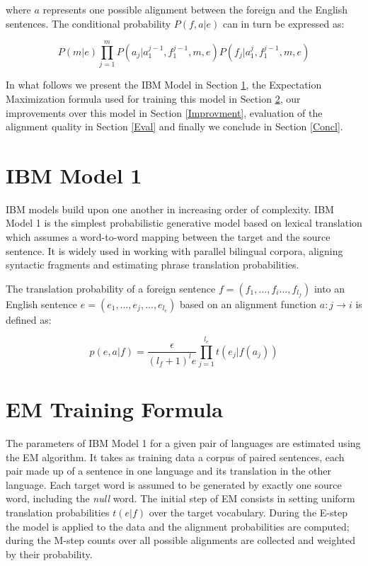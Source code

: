 \documentclass[11pt]{article}
\begin{document}
where $a$ represents one possible alignment between the foreign and the English sentences. The conditional probability $P(f,a|e)$ can in turn be expressed as:

\begin{equation}
P(m|e) \prod_{j=1}^{m} P(a_j|a_1^{j-1}, f_1^{j-1}, m, e) P(f_j|a_1^j,f_1^{j-1},m,e)
\end{equation}

In what follows we present the IBM Model in Section \ref{IBM1}, the Expectation Maximization formula used for training this model in Section \ref{EM}, our improvements over this model in Section \ref{Improvment}, evaluation of the alignment quality in Section \ref{Eval} and finally we conclude in Section \ref{Concl}.



\section{IBM Model 1}
\label{IBM1}
IBM models build upon one another in increasing order of complexity. IBM Model 1 is the simplest probabilistic generative model based on lexical translation which assumes a word-to-word mapping between the target and the source sentence. It is widely used in working with parallel bilingual corpora, aligning syntactic fragments and estimating phrase translation probabilities.

The translation probability of a foreign sentence $f = (f_1,\dots, f_i \dots , f_{l_f})$ into an English sentence $e = (e_1,\dots, e_j,\dots , e_{l_e})$ based on an alignment function $a : j \rightarrow i$ is defined as:

\begin{equation}
p(e,a|f) = \frac{\epsilon}{(l_f + 1)^le} \prod_{j=1}^{l_e}t(e_j|f(a_j))
\end{equation}

\section{EM Training Formula}
\label{EM}
The parameters of IBM Model 1 for a given pair of languages are estimated using the EM algorithm. It takes as training data a corpus of paired sentences, each pair made up of a sentence in one language and its translation in the other language. Each target word is assumed to be generated by exactly one source word, including the \textit{null} word. The initial step of EM consists in setting uniform translation probabilities $t(e|f)$ over the target vocabulary. During the E-step the model is applied to the data and the alignment probabilities are computed; during the M-step counts over all possible alignments are collected and weighted by their probability. 
\end{document}
